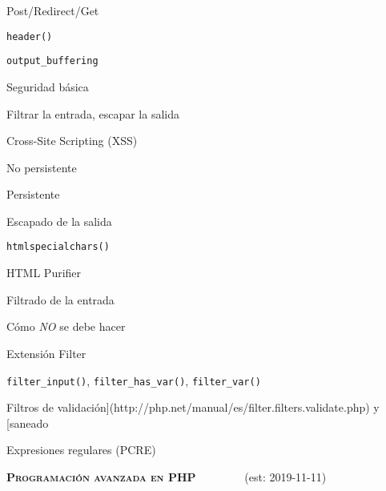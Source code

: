 \begin{longenum}
\begin{longenum}
\begin{longenum}
        \end{longenum}
        \item Post/Redirect/Get
        \item \texttt{header()}
        \begin{longenum}
            \item \texttt{output\_buffering}
        \end{longenum}
        \item Seguridad básica
        \begin{longenum}
            \item Filtrar la entrada, escapar la salida
            \item Cross-Site Scripting (XSS)
            \begin{longenum}
                \item No persistente
                \item Persistente
                \item Escapado de la salida
                \begin{longenum}
                    \item \texttt{htmlspecialchars()}
                    \item HTML Purifier
                \end{longenum}
            \end{longenum}
            \item Filtrado de la entrada
            \begin{longenum}
                \item Cómo \textit{NO} se debe hacer
                \item Extensión Filter
                \begin{longenum}
                    \item \texttt{filter\_input()}, \texttt{filter\_has\_var()}, \texttt{filter\_var()}
                    \item Filtros de validación](http://php.net/manual/es/filter.filters.validate.php) y [saneado
                \end{longenum}
                \item Expresiones regulares (PCRE)
            \end{longenum}
        \end{longenum}
    \end{longenum}
    \item \textbf{\textsc{Programación avanzada en PHP}} \ \ \ \ \ \ \ \ (est: \mbox{2019-11-11})

\end{longenum}

